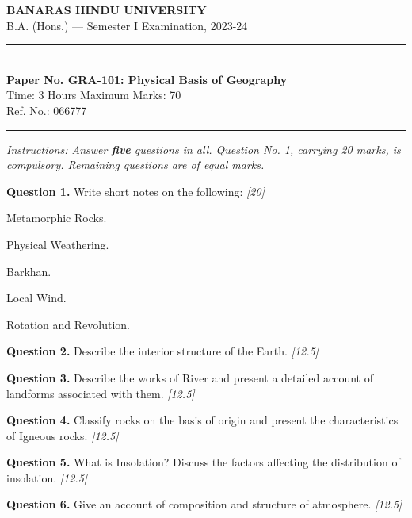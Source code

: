 \documentclass[11pt,a4paper]{article}
\newcommand{\pts}[1]{\hfill   \textit{[#1]}}
\begin{document}
\begin{center}
  {\large\bfseries BANARAS HINDU UNIVERSITY}\\[2pt]
  {\normalsize B.A. (Hons.) --- Semester I Examination, 2023-24}\\[6pt]
  \rule{0.8\linewidth}{0.5pt}\\[6pt]
  {\large\bfseries Paper No. GRA-101: Physical Basis of Geography}\\[4pt]
  {\normalsize Time: 3 Hours \hfill Maximum Marks: 70}\\[2pt]
  {\small Ref. No.: 066777}
\end{center}
\rule{\linewidth}{0.4pt}
\smallskip



\noindent   \textit{Instructions: Answer   \textbf{five} questions in all. Question No. 1, carrying 20 marks, is compulsory. Remaining questions are of equal marks.}
\bigskip




\noindent   \textbf{Question 1.} Write short notes on the following: \pts{20}

\begin{parts}
  \item Metamorphic Rocks.
  \item Physical Weathering.
  \item Barkhan.
  \item Local Wind.
  \item Rotation and Revolution.
\end{parts}

\medskip


\noindent   \textbf{Question 2.} Describe the interior structure of the Earth. \pts{12.5}

\medskip


\noindent   \textbf{Question 3.} Describe the works of River and present a detailed account of landforms associated with them. \pts{12.5}

\medskip


\noindent   \textbf{Question 4.} Classify rocks on the basis of origin and present the characteristics of Igneous rocks. \pts{12.5}

\medskip


\noindent   \textbf{Question 5.} What is Insolation? Discuss the factors affecting the distribution of insolation. \pts{12.5}

\medskip


\noindent   \textbf{Question 6.} Give an account of composition and structure of atmosphere. \pts{12.5}
\end{document}
